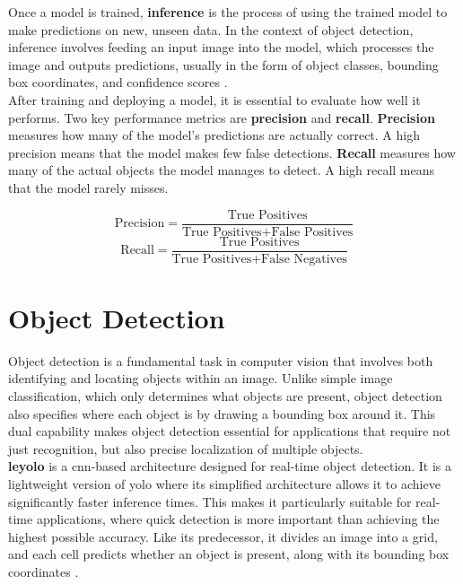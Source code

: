 Once a model is trained, \textbf{inference} is the process of using the trained model to make predictions on new, unseen data. In the context of object detection, inference involves feeding an input image into the model, which processes the image and outputs predictions, usually in the form of object classes, bounding box coordinates, and confidence scores \cite{nvidia:inference}. \\

After training and deploying a model, it is essential to evaluate how well it performs. Two key performance metrics are \textbf{precision} and \textbf{recall}. \textbf{Precision} measures how many of the model’s predictions are actually correct. A high precision means that the model makes few false detections. \textbf{Recall} measures how many of the actual objects the model manages to detect. A high recall means that the model rarely misses.

\[
\text{Precision} = \frac{\text{True Positives}}{\text{True Positives} + \text{False Positives}}
\]
\[
\text{Recall} = \frac{\text{True Positives}}{\text{True Positives} + \text{False Negatives}}
\]

\section{Object Detection}
\label{sec:object-detection}

Object detection is a fundamental task in computer vision that involves both identifying and locating objects within an image. Unlike simple image classification, which only determines what objects are present, object detection also specifies where each object is by drawing a bounding box around it. This dual capability makes object detection essential for applications that require not just recognition, but also precise localization of multiple objects. \\

\textbf{\gls{leyolo}} is a \gls{cnn}-based architecture designed for real-time object detection. It is a lightweight version of \gls{yolo} where its simplified architecture allows it to achieve significantly faster inference times. This makes it particularly suitable for real-time applications, where quick detection is more important than achieving the highest possible accuracy. Like its predecessor, it divides an image into a grid, and each cell predicts whether an object is present, along with its bounding box coordinates \cite{openreview:leyolo}.\\

